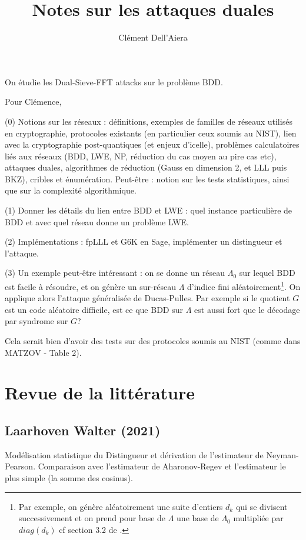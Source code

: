 \documentclass{article}
\title{Notes sur les attaques duales}
\author{Clément Dell'Aiera}
\begin{document}
\maketitle

On étudie les Dual-Sieve-FFT attacks sur le problème BDD.

Pour Clémence,

(0) Notions sur les réseaux : définitions, exemples de familles de réseaux utilisés en cryptographie, protocoles existants (en particulier ceux soumis au NIST), lien avec la cryptographie post-quantiques (et enjeux d'icelle), problèmes calculatoires liés aux réseaux (BDD,  LWE, NP, réduction du cas moyen au pire cas etc), attaques duales, algorithmes de réduction (Gauss en dimension 2, et LLL puis BKZ), cribles et énumération. Peut-être : notion sur les tests statistiques, ainsi que sur la complexité algorithmique.  

(1) Donner les détails du lien entre BDD et LWE : quel instance particulière de BDD et avec quel réseau donne un problème LWE.

(2) Implémentations : fpLLL et G6K en Sage, implémenter un distingueur et l'attaque.

(3) Un exemple peut-être intéressant : on se donne un réseau $\Lambda_0$ sur lequel BDD est facile à résoudre, et on génère un sur-réseau $\Lambda$ d'indice fini aléatoirement\footnote{Par exemple, on génère aléatoirement une suite d'entiers $d_k$ qui se divisent successivement et on prend pour base de $\Lambda$ une base de $\Lambda_0$ multipliée par $diag(d_k)$ cf section 3.2 de \cite{DucasPulles}.}. On applique alors l'attaque généralisée de Ducas-Pulles. Par exemple si le quotient $G$ est un code aléatoire difficile, est ce que BDD sur $\Lambda$ est aussi fort que le décodage par syndrome sur $G$?

Cela serait bien d'avoir des tests sur des protocoles soumis au NIST (comme dans MATZOV - Table 2).

\section{Revue de la littérature}

\subsection{Laarhoven Walter (2021)}

Modélisation statistique du Distingueur et dérivation de l'estimateur de Neyman-Pearson. Comparaison avec l'estimateur de Aharonov-Regev et l'estimateur le plus simple (la somme des cosinus). 
\end{document}
